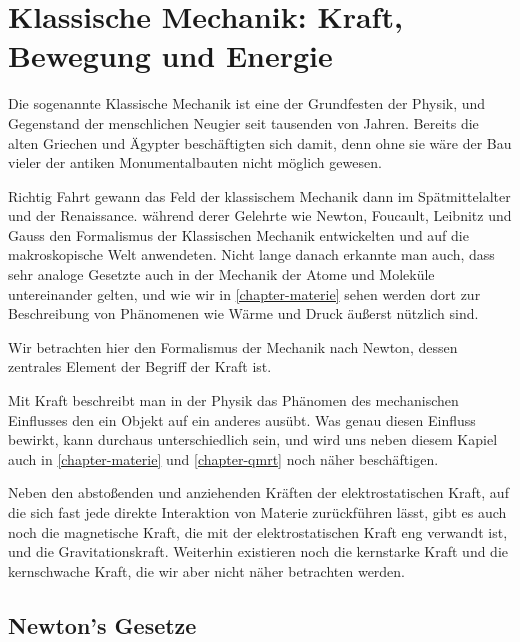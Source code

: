 
\chapter{Klassische Mechanik: Kraft, Bewegung und Energie}
\label{chapter-mechanik}

Die sogenannte Klassische Mechanik ist eine der Grundfesten der Physik, und Gegenstand der menschlichen Neugier seit tausenden von Jahren. Bereits die alten Griechen und Ägypter beschäftigten sich damit, denn ohne sie wäre der Bau vieler der antiken Monumentalbauten nicht möglich gewesen.

Richtig Fahrt gewann das Feld der klassischem Mechanik dann im Spätmittelalter und der Renaissance. während derer Gelehrte wie Newton, Foucault, Leibnitz und Gauss den Formalismus der Klassischen Mechanik entwickelten und auf die makroskopische Welt anwendeten. Nicht lange danach erkannte man auch, dass sehr analoge Gesetzte auch in der Mechanik der Atome und Moleküle untereinander gelten, und wie wir in \ref{chapter-materie} sehen werden dort zur Beschreibung von Phänomenen wie Wärme und Druck äußerst nützlich sind.


Wir betrachten hier den Formalismus der Mechanik nach Newton, dessen zentrales Element der Begriff der Kraft ist. 

Mit Kraft beschreibt man in der Physik das Phänomen des mechanischen Einflusses den ein Objekt auf ein anderes ausübt. Was genau diesen Einfluss bewirkt, kann durchaus unterschiedlich sein, und wird uns neben diesem Kapiel auch in \ref{chapter-materie} und \ref{chapter-qmrt} noch näher beschäftigen.

Neben den abstoßenden und anziehenden Kräften der elektrostatischen Kraft, auf die sich fast jede direkte Interaktion von Materie zurückführen lässt, gibt es auch noch die magnetische Kraft, die mit der elektrostatischen Kraft eng verwandt ist, und die Gravitationskraft. Weiterhin existieren noch die kernstarke Kraft und die kernschwache Kraft, die wir aber nicht näher betrachten werden.

\section{Newton's Gesetze}
\label{chapter-newtonslaws}

